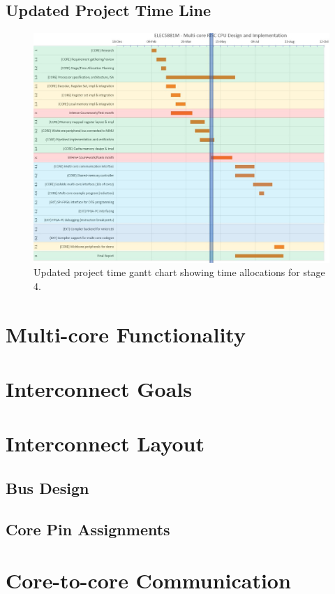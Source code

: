 \documentclass[11pt,a4paper]{report}
\begin{document}
{\subsection{Updated Project Time Line}

\begin{figure}[h]
\centering 
\includegraphics[width=12cm]{../img/week2_gantt}
\caption{Updated project time gantt chart showing time allocations for stage 4.}
\label{fig:week2_gantt}
\end{figure}

\section{Multi-core Functionality}
    \section{Interconnect Goals}
    \section{Interconnect Layout}
        \subsection{Bus Design}
        \subsection{Core Pin Assignments}
    \section{Core-to-core Communication}
}
\end{document}
